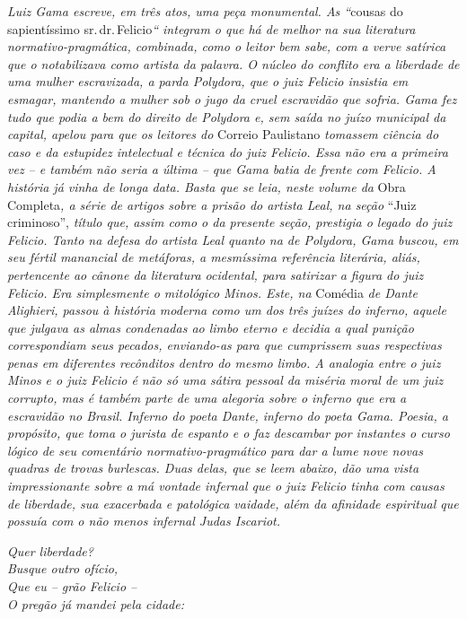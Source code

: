\begin{argumento}
\emph{Luiz Gama escreve, em três atos, uma peça monumental. As ``}cousas
do sapientíssimo sr.\,dr.\,Felicio\emph{`` integram o que há de melhor na
sua literatura normativo-pragmática, combinada, como o leitor bem sabe,
com a verve satírica que o notabilizava como artista da palavra. O
núcleo do conflito era a liberdade de uma mulher escravizada, a parda
Polydora, que o juiz Felicio insistia em esmagar, mantendo a mulher sob
o jugo da cruel escravidão que sofria. Gama fez tudo que podia a bem do
direito de Polydora e, sem saída no juízo municipal da capital, apelou
para que os leitores do} Correio Paulistano \emph{tomassem ciência do
caso e da estupidez intelectual e técnica do juiz Felicio. Essa não era
a primeira vez -- e também não seria a última -- que Gama batia de
frente com Felicio. A história já vinha de longa data. Basta que se
leia, neste volume da} Obra Completa\emph{, a série de artigos sobre a
prisão do artista Leal, na seção} ``Juiz criminoso'', \emph{título que,
assim como o da presente seção, prestigia o legado do juiz Felicio.
Tanto na defesa do artista Leal quanto na de Polydora, Gama buscou, em
seu fértil manancial de metáforas, a mesmíssima referência literária,
aliás, pertencente ao cânone da literatura ocidental, para satirizar a
figura do juiz Felicio. Era simplesmente o mitológico Minos. Este, na}
Comédia \emph{de Dante Alighieri, passou à história moderna como um dos
três juízes do inferno, aquele que julgava as almas condenadas ao limbo
eterno e decidia a qual punição correspondiam seus pecados, enviando-as
para que cumprissem suas respectivas penas em diferentes recônditos
dentro do mesmo limbo. A analogia entre o juiz Minos e o juiz Felicio é
não só uma sátira pessoal da miséria moral de um juiz corrupto, mas é
também parte de uma alegoria sobre o inferno que era a escravidão no
Brasil. Inferno do poeta Dante, inferno do poeta Gama. Poesia, a
propósito, que toma o jurista de espanto e o faz descambar por instantes
o curso lógico de seu comentário normativo-pragmático para dar a lume
nove novas quadras de trovas burlescas. Duas delas, que se leem abaixo,
dão uma vista impressionante sobre a má vontade infernal que o juiz
Felicio tinha com causas de liberdade, sua exacerbada e patológica
vaidade, além da afinidade espiritual que possuía com o não menos
infernal Judas Iscariot.}
\end{argumento}

\emph{Quer liberdade?\\
Busque outro ofício,\\
Que eu -- grão Felicio --\\
O pregão já mandei pela cidade:}

